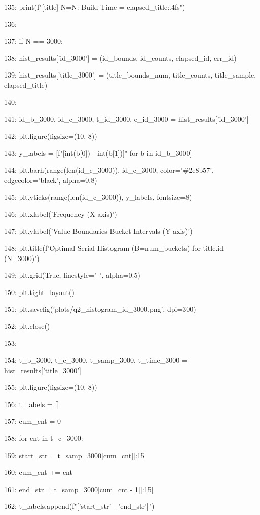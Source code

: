 \documentclass[11pt,a4paper]{article}
\begin{document}
135:         print(f"[title] N={N}: Build Time = {elapsed\_title:.4f}s")

136:

137:         if N == 3000:

138:             hist\_results['id\_3000'] = (id\_bounds, id\_counts, elapsed\_id, err\_id)

139:             hist\_results['title\_3000'] = (title\_bounds\_num, title\_counts, title\_sample, elapsed\_title)

140:

141:     id\_b\_3000, id\_c\_3000, t\_id\_3000, e\_id\_3000 = hist\_results['id\_3000']

142:     plt.figure(figsize=(10, 8))

143:     y\_labels = [f"[{int(b[0])} - {int(b[1])}]" for b in id\_b\_3000]

144:     plt.barh(range(len(id\_c\_3000)), id\_c\_3000, color='\#2e8b57', edgecolor='black', alpha=0.8)

145:     plt.yticks(range(len(id\_c\_3000)), y\_labels, fontsize=8)

146:     plt.xlabel('Frequency (X-axis)')

147:     plt.ylabel('Value Boundaries Bucket Intervals (Y-axis)')

148:     plt.title(f'Optimal Serial Histogram (B={num\_buckets}) for title.id (N=3000)')

149:     plt.grid(True, linestyle='--', alpha=0.5)

150:     plt.tight\_layout()

151:     plt.savefig('plots/q2\_histogram\_id\_3000.png', dpi=300)

152:     plt.close()

153:

154:     t\_b\_3000, t\_c\_3000, t\_samp\_3000, t\_time\_3000 = hist\_results['title\_3000']

155:     plt.figure(figsize=(10, 8))

156:     t\_labels = []

157:     cum\_cnt = 0

158:     for cnt in t\_c\_3000:

159:         start\_str = t\_samp\_3000[cum\_cnt][:15]

160:         cum\_cnt += cnt

161:         end\_str = t\_samp\_3000[cum\_cnt - 1][:15]

162:         t\_labels.append(f"['{start\_str}' - '{end\_str}']")
\end{document}
